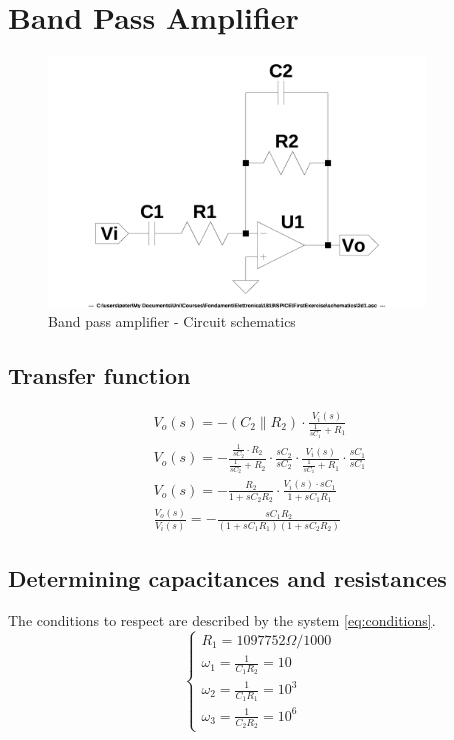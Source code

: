 \documentclass[10pt,a4paper]{book}
\begin{document}
\chapter{Band Pass Amplifier}

\begin{figure}[H]
  \centering
  \includegraphics[width=10cm]{schematics/2d1.jpg}
  \caption{Band pass amplifier - Circuit schematics}
  \label{2d1schematics}
\end{figure}

\section{Transfer function}

\begin{align}
  V_o(s) = - (C_2 \parallel R_2) \cdot \frac{V_i(s)}{\frac{1}{sC_1}+R_1} \nonumber \\
  V_o(s) = - \frac{\frac{1}{sC_2} \cdot R_2}{\frac{1}{sC_2}+R_2} \cdot \frac{sC_2}{sC_2} \cdot \frac{V_i(s)}{\frac{1}{sC_1}+R_1} \cdot \frac{sC_1}{sC_1} \nonumber \\
  V_o(s) = - \frac{R_2}{1+sC_2R_2} \cdot \frac{V_i(s) \cdot sC_1}{1+sC_1R_1} \nonumber \\
  \frac{V_o(s)}{V_i(s)} = - \frac{sC_1R_2}{(1+sC_1R_1)(1+sC_2R_2)}
\end{align}

\section{Determining capacitances and resistances}
The conditions to respect are described by the system \ref{eq:conditions}.
\begin{equation}
  \left\{
  \begin{array}{l}
    R_1 = 1097752\Omega/1000 \\
    \omega_1 = \frac{1}{C_1R_2} = 10 \\
    \omega_2 = \frac{1}{C_1R_1} = 10^3 \\
    \omega_3 = \frac{1}{C_2R_2} = 10^6
  \end{array}
  \right. \label{eq:conditions}
\end{equation}
\end{document}
